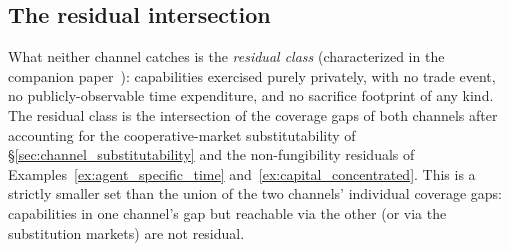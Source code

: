 \subsection{The residual intersection}

What neither channel catches is the \emph{residual class}
(characterized in the companion paper~\citep[Need~Sufficiency]{lasser2026paper8b}):
capabilities exercised purely privately, with no trade event,
no publicly-observable time expenditure, and no sacrifice
footprint of any kind.  The
residual class is the intersection of the coverage gaps of both
channels after accounting for the cooperative-market
substitutability of \S\ref{sec:channel_substitutability} and the
non-fungibility residuals of
Examples~\ref{ex:agent_specific_time}
and~\ref{ex:capital_concentrated}.  This is a strictly smaller
set than the union of the two channels' individual coverage gaps:
capabilities in one channel's gap but reachable via the other
(or via the substitution markets) are not residual.
